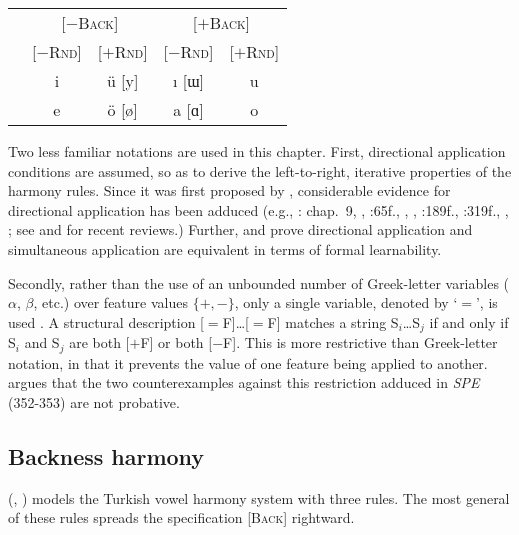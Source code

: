 \begin{example}
\begin{tabular}{c c c c c}
                       & \multicolumn{2}{c}{[$-$\textsc{Back}]} & \multicolumn{2}{c}{[$+$\textsc{Back}]} \\
                       & [$-$\textsc{Rnd}] & [$+$\textsc{Rnd}] & [$-$\textsc{Rnd}] & [$+$\textsc{Rnd}] \\ 
\cmidrule{2-5}
 & {i} & {ü} [y] & {ı} [ɯ] & {u} \\
 & {e} & {ö} [ø] & {a} [ɑ] & {o} \\
\end{tabular}
\end{example}

Two less familiar notations are used in this chapter. First, directional application conditions are assumed, so as to derive the left-to-right, iterative properties of the harmony rules. Since it was first proposed by \citet{Johnson1972}, considerable evidence for directional application has been adduced (e.g., \citealt{A74}: chap.~9, \citealt{GormanInPressc}, \citealt{Howard1972}:65f., \citealt{Kavitskaya2008}, \citealt{Kaye1982}, \citealt{KK77}:189f., \citeyear{KK79}:319f., \citealt{Piggott1975}, \citealt{Sohn1971}; see \citealt{McCarthy2003b} and \citealt{Wolf2011b} for recent reviews.) Further, \citet{Johnson1972} and \citet{Kaplan1994} prove directional application and simultaneous application are equivalent in terms of formal learnability.

Secondly, rather than the use of an unbounded number of Greek-letter variables ($\alpha$, $\beta$, etc.) over feature values $\{+, -\}$, only a single variable, denoted by `$=$', is used \citep{McCawley1973}. A structural description [$=$F]\ldots{}[$=$F] matches a string S$_i$\ldots{}S$_j$ if and only if S$_i$ and S$_j$ are both [$+$F] or both [$-$F]. This is more restrictive than Greek-letter notation, in that it prevents the value of one feature being applied to another. \citet{Odden2012} argues that the two counterexamples against this restriction adduced in \emph{SPE} (352-353) are not probative.

\subsection{Backness harmony}

\citeauthor{Lees1966b} (\citeyear[35]{Lees1966b}, \citeyear[284]{Lees1966a}) models the Turkish vowel harmony system with three rules. The most general of these rules spreads the specification [\textsc{Back}] rightward.

